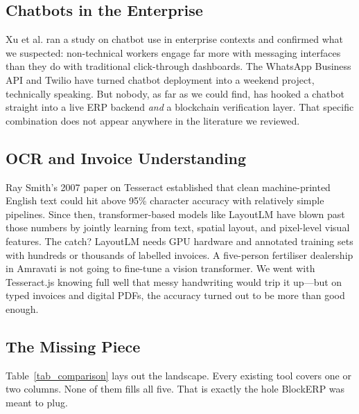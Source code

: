 \documentclass[conference]{IEEEtran}
\begin{document}
\subsection{Chatbots in the Enterprise}
Xu et al. \cite{b14} ran a study on chatbot use in enterprise contexts and confirmed what we suspected: non-technical workers engage far more with messaging interfaces than they do with traditional click-through dashboards. The WhatsApp Business API and Twilio have turned chatbot deployment into a weekend project, technically speaking. But nobody, as far as we could find, has hooked a chatbot straight into a live ERP backend \emph{and} a blockchain verification layer. That specific combination does not appear anywhere in the literature we reviewed.

\subsection{OCR and Invoice Understanding}
Ray Smith's 2007 paper on Tesseract \cite{b12} established that clean machine-printed English text could hit above 95\% character accuracy with relatively simple pipelines. Since then, transformer-based models like LayoutLM \cite{b13} have blown past those numbers by jointly learning from text, spatial layout, and pixel-level visual features. The catch? LayoutLM needs GPU hardware and annotated training sets with hundreds or thousands of labelled invoices. A five-person fertiliser dealership in Amravati is not going to fine-tune a vision transformer. We went with Tesseract.js knowing full well that messy handwriting would trip it up---but on typed invoices and digital PDFs, the accuracy turned out to be more than good enough.

\subsection{The Missing Piece}
Table~\ref{tab_comparison} lays out the landscape. Every existing tool covers one or two columns. None of them fills all five. That is exactly the hole BlockERP was meant to plug.
\end{document}
